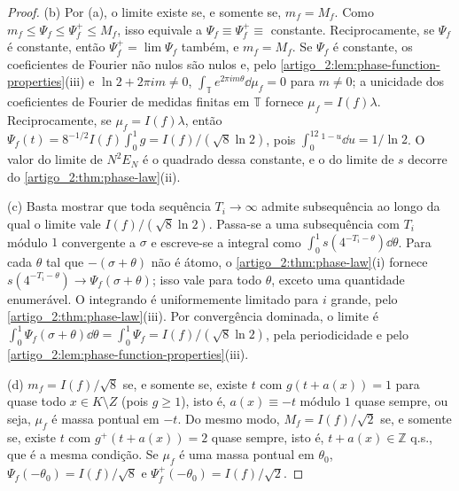 \begin{proof}
(b) Por (a), o limite existe se, e somente se, $m_f=M_f$. Como
$m_f\le\Psi_f\le\Psi_f^+\le M_f$, isso equivale a $\Psi_f\equiv\Psi_f^+\equiv$
constante. Reciprocamente, se $\Psi_f$ é constante, então $\Psi_f^+=\lim\Psi_f$ também,
e $m_f=M_f$. Se $\Psi_f$ é constante, os coeficientes de Fourier não nulos
são nulos e, pelo \cref{artigo_2:lem:phase-function-properties}(iii) e
$\ln2+2\pi im\ne0$, $\int_{\mathbb T}e^{2\pi im\theta}\dd\mu_f=0$ para $m\ne0$; a
unicidade dos coeficientes de Fourier de medidas finitas em $\mathbb T$ fornece
$\mu_f=I(f)\lambda$. Reciprocamente, se $\mu_f=I(f)\lambda$, então
$\Psi_f(t)=8^{-1/2}I(f)\int_0^1g=I(f)/(\sqrt8\ln2)$, pois
$\int_0^12^{1-u}\dd u=1/\ln2$. O valor do limite de $N^2E_N$ é o quadrado dessa
constante, e o do limite de $s$ decorre do \cref{artigo_2:thm:phase-law}(ii).

(c) Basta mostrar que toda sequência $T_i\to\infty$ admite subsequência ao longo
da qual o limite vale $I(f)/(\sqrt8\ln2)$. Passa-se a uma subsequência com $T_i$
módulo $1$ convergente a $\sigma$ e escreve-se a integral como
$\int_0^1s(4^{-T_i-\theta})\dd\theta$. Para cada $\theta$ tal que
$-(\sigma+\theta)$ não é átomo, o \cref{artigo_2:thm:phase-law}(i) fornece
$s(4^{-T_i-\theta})\to\Psi_f(\sigma+\theta)$; isso vale para todo $\theta$, exceto
uma quantidade enumerável. O integrando é uniformemente limitado para $i$
grande, pelo \cref{artigo_2:thm:phase-law}(iii). Por convergência dominada, o limite é
$\int_0^1\Psi_f(\sigma+\theta)\dd\theta=\int_0^1\Psi_f=I(f)/(\sqrt8\ln2)$, pela
periodicidade e pelo \cref{artigo_2:lem:phase-function-properties}(iii).

(d) $m_f=I(f)/\sqrt8$ se, e somente se, existe $t$ com $g(t+a(x))=1$ para quase
todo $x\in K\setminus Z$ (pois $g\ge1$), isto é, $a(x)\equiv-t$ módulo $1$ quase
sempre, ou seja, $\mu_f$ é massa pontual em $-t$. Do mesmo modo,
$M_f=I(f)/\sqrt2$ se, e somente se, existe $t$ com $g^+(t+a(x))=2$ quase
sempre, isto é, $t+a(x)\in\mathbb Z$ q.s., que é a mesma condição. Se $\mu_f$ é uma massa
pontual em $\theta_0$, $\Psi_f(-\theta_0)=I(f)/\sqrt8$ e
$\Psi_f^+(-\theta_0)=I(f)/\sqrt2$.
\end{proof}

